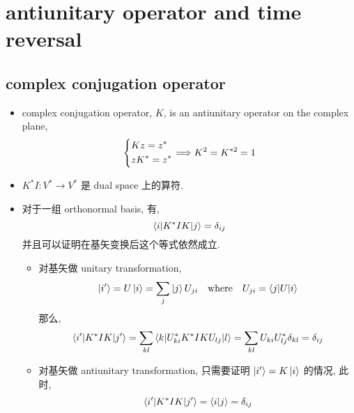 \chapter{antiunitary operator and time reversal}
\section{complex conjugation operator}
\begin{itemize}
	\item complex conjugation operator, $K$, is an antiunitary operator on the complex plane,
	\begin{equation}
		\begin{dcases}
			K z = z^* \\
			z K^* = z^*
		\end{dcases} \Longrightarrow K^2 = K^{* 2} = 1
	\end{equation}
	
	\item $K^* I : V^* \rightarrow V^*$ 是 dual space 上的算符.
	
	\item 对于一组 orthonormal basis, 有,
	\begin{equation}
		\braket{i | K^* I K | j} = \delta_{i j}
	\end{equation}
	并且可以证明在基矢变换后这个等式依然成立.
	
	\begin{tcolorbox}[title=proof:]
		\begin{itemize}
			\item 对基矢做 unitary transformation,
			\begin{equation}
				\ket{i'} = U \ket{i} = \sum_j \ket{j} U_{j i} \quad \text{where} \quad U_{j i} = \braket{j | U | i}
			\end{equation}
			那么,
			\begin{equation}
				\braket{i' | K^* I K | j'} = \sum_{k l} \braket{k | U^*_{k i} K^* I K U_{l j} | l} = \sum_{k l} U_{k i} U^*_{l j} \delta_{k l} = \delta_{i j}
			\end{equation}
			
			\item 对基矢做 antiunitary transformation, 只需要证明 $\ket{i'} = K \ket{i}$ 的情况, 此时,
			\begin{equation}
				\braket{i' | K^* I K | j'} = \braket{i | j} = \delta_{i j}
			\end{equation}
		\end{itemize}
	\end{tcolorbox}
\end{itemize}

